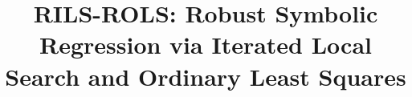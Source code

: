 \documentclass{bmcart}
\begin{document}
\begin{frontmatter}

\begin{fmbox}


\title{ {RILS}-{ROLS}: Robust Symbolic Regression via Iterated Local Search and Ordinary Least Squares}


\author[
  addressref={aff1},                   %
  corref={aff1},                       %
  email={kartelj@matf.bg.ac.rs}   %
]{ }
\author[
  addressref={aff2},
  email={marko.djukanovic@pmf.unibl.org}
]{ }


\address[id=aff1]{%
  ,             %
  ,          %
  ,                              %
}
\address[id=aff2]{%
  ,
  ,
  ,
}


\end{fmbox}
\end{frontmatter}
\end{document}

